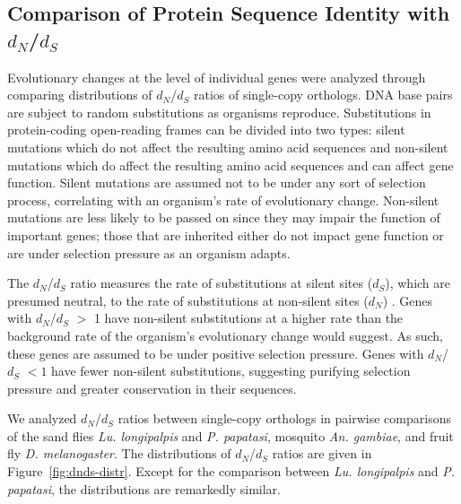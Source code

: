 \subsection{Comparison of Protein Sequence Identity with $d_N$/$d_S$}
Evolutionary changes at the level of individual genes were analyzed through comparing distributions of $d_N$/$d_S$ ratios of single-copy orthologs. DNA base pairs are subject to random substitutions as organisms reproduce.  Substitutions in protein-coding open-reading frames can be divided into two types: silent mutations which do not affect the resulting amino acid sequences and non-silent mutations which do affect the resulting amino acid sequences and can affect gene function.  Silent mutations are assumed not to be under any sort of selection process, correlating with an organism's rate of evolutionary change.  Non-silent mutations are less likely to be passed on since they may impair the function of important genes; those that are inherited either do not impact gene function or are under selection pressure as an organism adapts.

The $d_N$/$d_S$ ratio measures the rate of substitutions at silent sites ($d_S$), which are presumed neutral, to the rate of substitutions at non-silent sites ($d_N$) \cite{Kryazhimskiy2008}. Genes with $d_N$/$d_S$ $>$ 1 have non-silent substitutions at a higher rate than the background rate of the organism's evolutionary change would suggest.  As such, these genes are assumed to be under positive selection pressure.  Genes with $d_N$/$d_S$ $<1$ have fewer non-silent substitutions, suggesting purifying selection pressure and greater conservation in their sequences.

We analyzed $d_N$/$d_S$ ratios between single-copy orthologs in pairwise comparisons of the sand flies \emph{Lu. longipalpis} and \emph{P. papatasi}, mosquito \emph{An. gambiae}, and fruit fly \emph{D. melanogaster}.  The distributions of $d_N$/$d_S$ ratios are given in Figure~\ref{fig:dnds-distr}.  Except for the comparison between \emph{Lu. longipalpis} and \emph{P. papatasi}, the distributions are remarkedly similar.

